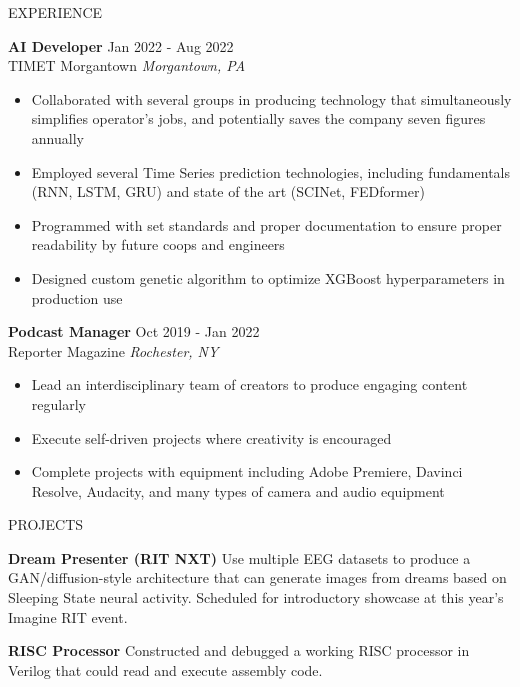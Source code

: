 \documentclass{resume} %
\begin{document}
\begin{rSection}{EXPERIENCE}

\textbf{AI Developer} \hfill Jan 2022 - Aug 2022\\
TIMET Morgantown \hfill \textit{Morgantown, PA}
 \begin{itemize}
    \itemsep-3pt {}
     \item Collaborated with several groups in producing technology that simultaneously simplifies operator’s jobs, and potentially saves the company seven figures annually
     \item Employed several Time Series prediction technologies, including fundamentals (RNN, LSTM, GRU) and state of the art (SCINet, FEDformer)
    \item Programmed with set standards and proper documentation to ensure proper readability by future coops and engineers
    \item Designed custom genetic algorithm to optimize XGBoost hyperparameters in production use
 \end{itemize}
 
\textbf{Podcast Manager} \hfill Oct 2019 - Jan 2022\\
Reporter Magazine \hfill \textit{Rochester, NY}
 \begin{itemize}
    \itemsep-3pt {} 
     \item Lead an interdisciplinary team of creators to produce engaging content regularly
     \item Execute self-driven projects where creativity is encouraged
    \item Complete projects with equipment including Adobe Premiere, Davinci Resolve, Audacity, and many types of camera and audio equipment 
 \end{itemize}

\end{rSection} 


\begin{rSection}{PROJECTS}
\vspace{-1.25em}
\item \textbf{Dream Presenter (RIT NXT)} {Use multiple EEG datasets to produce a GAN/diffusion-style architecture that can generate images from dreams based on Sleeping State neural activity. Scheduled for introductory showcase at this year's Imagine RIT event.}
\item \textbf{RISC Processor} {Constructed and debugged a working RISC processor in Verilog that could read and execute assembly code.}
\end{rSection} 
\end{document}
